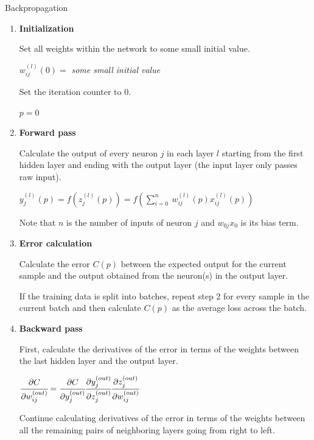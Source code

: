 \begin{algorithm}[H]
\caption{Backpropagation}
\label{alg:backpropagation}
\begin{enumerate}
    \setlength{\parsep}{5pt}
    \item \textbf{Initialization}
    
    Set all weights within the network to some small initial value.
    
    $ w_{ij}^{(l)}(0) = $ \textit{some small initial value}
    
    Set the iteration counter to 0.
    
    $ p = 0 $
    
    \item \textbf{Forward pass}
    
    Calculate the output of every neuron $j$ in each layer $l$ starting from the first hidden layer
    and ending with the output layer (the input layer only passes raw input).
    
     $y_j^{(l)}(p) = f \left( z_j^{(l)}(p) \right)
     = f\left( \displaystyle{\sum_{i=0}^n} \: w_{ij}^{(l)}(p) x_{ij}^{(l)}(p)  \right)$
     
     Note that $n$ is the number of inputs of neuron $j$ and $w_{0j} x_0$
     is its bias term.
     
     \item \textbf{Error calculation}
     
     Calculate the error $C(p)$ between the expected output for the current sample
     and the output obtained from the neuron(s) in the output layer.
     
     If the training data is split into batches, repeat step 2 for every sample
     in the current batch and then calculate $C(p)$ as the average loss across the batch.
    
     \item \textbf{Backward pass} %
     
     First, calculate the derivatives of the error in terms of the weights
     between the last hidden layer and the output layer.
     
     $ \cfrac{\partial C}{\partial w_{ij}^{(out)}} = \cfrac{\partial C}{\partial y_j^{(out)}}
       \cfrac{\partial y_j^{(out)}}{\partial z_j^{(out)}}
       \cfrac{\partial z_j^{(out)}}{\partial w_{ij}^{(out)}} $
       
     Continue calculating derivatives of the error in terms of the weights between all the remaining
     pairs of neighboring layers going from right to left.
       

\end{enumerate}
\end{algorithm}
